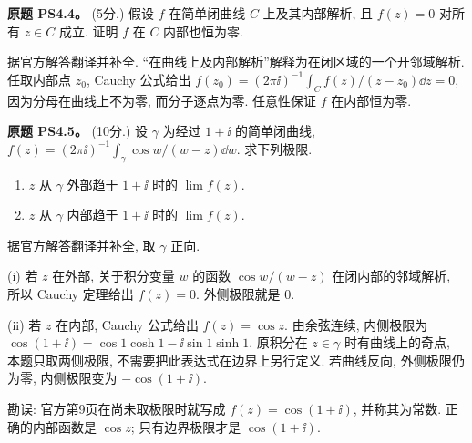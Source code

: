\begin{exercise}\label{ass:ps4-4}
\textbf{原题 PS4.4。} (5分.) 假设 $f$ 在简单闭曲线 $C$ 上及其内部解析, 且 $f(z)=0$ 对所有 $z\in C$ 成立. 证明 $f$ 在 $C$ 内部也恒为零.
\end{exercise}
\begin{solution}
据官方解答翻译并补全. “在曲线上及内部解析”解释为在闭区域的一个开邻域解析.
任取内部点 $z_0$, Cauchy 公式给出
$f(z_0)=(2\pi\ii)^{-1}\int_C f(z)/(z-z_0)\dd z=0$,
因为分母在曲线上不为零, 而分子逐点为零. 任意性保证 $f$ 在内部恒为零.
\end{solution}

\begin{exercise}\label{ass:ps4-5}
\textbf{原题 PS4.5。} (10分.) 设 $\gamma$ 为经过 $1+\ii$ 的简单闭曲线,
$f(z)=(2\pi\ii)^{-1}\int_\gamma\cos w/(w-z)\dd w$.
求下列极限.
\begin{enumerate}[label=(\roman*)]
\item $z$ 从 $\gamma$ 外部趋于 $1+\ii$ 时的 $\lim f(z)$.
\item $z$ 从 $\gamma$ 内部趋于 $1+\ii$ 时的 $\lim f(z)$.
\end{enumerate}
\end{exercise}
\begin{solution}
据官方解答翻译并补全, 取 $\gamma$ 正向.

(i) 若 $z$ 在外部, 关于积分变量 $w$ 的函数 $\cos w/(w-z)$ 在闭内部的邻域解析, 所以 Cauchy 定理给出 $f(z)=0$. 外侧极限就是 $0$.

(ii) 若 $z$ 在内部, Cauchy 公式给出 $f(z)=\cos z$. 由余弦连续,
内侧极限为 $\cos(1+\ii)=\cos1\cosh1-\ii\sin1\sinh1$.
原积分在 $z\in\gamma$ 时有曲线上的奇点, 本题只取两侧极限, 不需要把此表达式在边界上另行定义.
若曲线反向, 外侧极限仍为零, 内侧极限变为 $-\cos(1+\ii)$.

勘误: 官方第9页在尚未取极限时就写成 $f(z)=\cos(1+\ii)$, 并称其为常数. 正确的内部函数是 $\cos z$; 只有边界极限才是 $\cos(1+\ii)$.
\end{solution}

